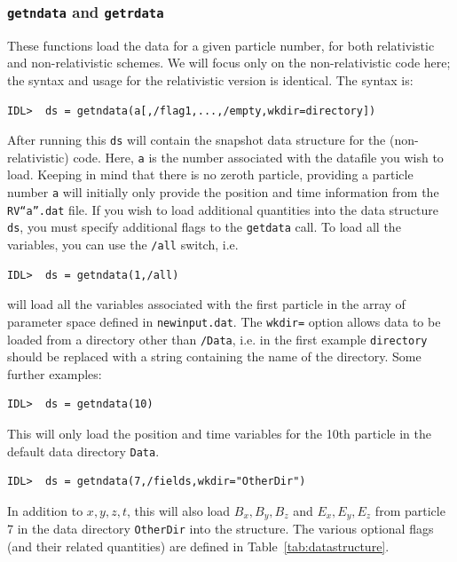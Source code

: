 \documentclass[a4paper,11pt,usenames,dvipsnames]{article}
\begin{document}
\subsubsection{\texttt{getndata} and \texttt{getrdata}}
These functions load the data for a given particle number, for both relativistic and non-relativistic schemes. We will focus only on the non-relativistic code here; the syntax and usage for the relativistic version is identical. The syntax is:
\begin{verbatim}
IDL>  ds = getndata(a[,/flag1,...,/empty,wkdir=directory])
\end{verbatim}
After running this \texttt{ds} will contain the snapshot data structure for the (non-relativistic) code. Here, \texttt{a} is the number associated with the datafile you wish to load. Keeping in mind that there is no zeroth particle, providing a particle number \texttt{a} will initially only provide the position and time information from the \texttt{RV``a''.dat} file. If you wish to load additional quantities into the data structure \texttt{ds}, you must specify additional flags to the \texttt{getdata} call. To load all the variables, you can use the \texttt{/all} switch, i.e.
\begin{verbatim}
IDL>  ds = getndata(1,/all)
\end{verbatim}
will load all the variables associated with the first particle in the array of parameter space defined in \texttt{newinput.dat}.
The \texttt{wkdir=} option allows data to be loaded from a directory other than \texttt{/Data}, i.e. in the first example \texttt{directory} should be replaced with a string containing the name of the directory.
Some further examples:
\begin{verbatim}
IDL>  ds = getndata(10)
\end{verbatim}
This will only load the position and time variables for the 10th particle in the default data directory \texttt{Data}.
\begin{verbatim}
IDL>  ds = getndata(7,/fields,wkdir="OtherDir")
\end{verbatim}
In addition to $x,y,z,t$, this will also load $B_x, B_y, B_z$ and $E_x, E_y, E_z$ from particle 7 in the data directory \texttt{OtherDir} into the structure.
The various optional flags (and their related quantities) are defined in Table~\ref{tab:datastructure}.
\end{document}
